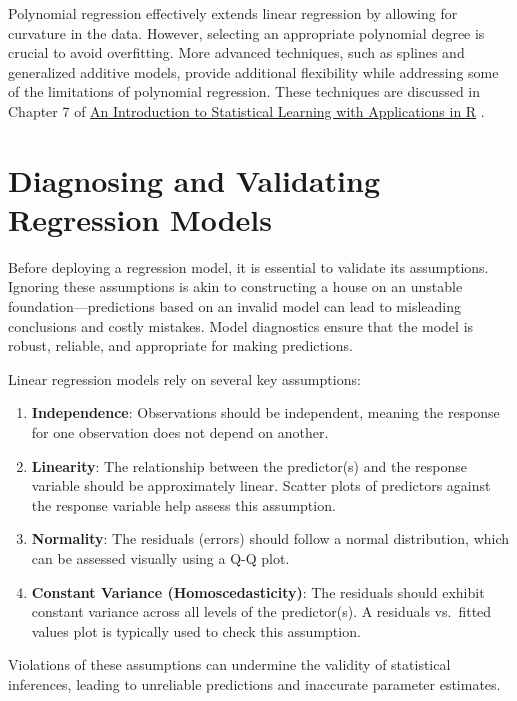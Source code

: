 \documentclass[
  11pt,
]{book}
\providecommand{\tightlist}{%
  \setlength{\itemsep}{0pt}\setlength{\parskip}{0pt}}
\theoremstyle{definition}
\theoremstyle{definition}
\theoremstyle{definition}
\theoremstyle{definition}
\theoremstyle{remark}
\begin{document}
Polynomial regression effectively extends linear regression by allowing for curvature in the data. However, selecting an appropriate polynomial degree is crucial to avoid overfitting. More advanced techniques, such as splines and generalized additive models, provide additional flexibility while addressing some of the limitations of polynomial regression. These techniques are discussed in Chapter 7 of \href{https://www.statlearning.com}{An Introduction to Statistical Learning with Applications in R} \citep{gareth2013introduction}.

\section{Diagnosing and Validating Regression Models}\label{diagnosing-and-validating-regression-models}

Before deploying a regression model, it is essential to validate its assumptions. Ignoring these assumptions is akin to constructing a house on an unstable foundation---predictions based on an invalid model can lead to misleading conclusions and costly mistakes. Model diagnostics ensure that the model is robust, reliable, and appropriate for making predictions.

Linear regression models rely on several key assumptions:

\begin{enumerate}
\def\labelenumi{\arabic{enumi}.}
\tightlist
\item
  \textbf{Independence}: Observations should be independent, meaning the response for one observation does not depend on another.\\
\item
  \textbf{Linearity}: The relationship between the predictor(s) and the response variable should be approximately linear. Scatter plots of predictors against the response variable help assess this assumption.\\
\item
  \textbf{Normality}: The residuals (errors) should follow a normal distribution, which can be assessed visually using a Q-Q plot.\\
\item
  \textbf{Constant Variance (Homoscedasticity)}: The residuals should exhibit constant variance across all levels of the predictor(s). A residuals vs.~fitted values plot is typically used to check this assumption.
\end{enumerate}

Violations of these assumptions can undermine the validity of statistical inferences, leading to unreliable predictions and inaccurate parameter estimates.
\end{document}
